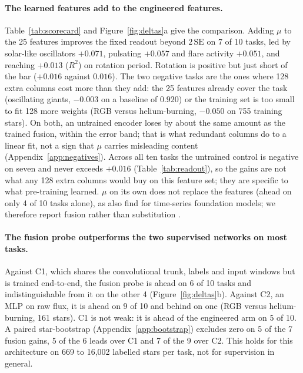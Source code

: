 \documentclass{article}
\begin{document}
\paragraph{The learned features add to the engineered features.} Table~\ref{tab:scorecard} and
Figure~\ref{fig:deltas}a give the comparison. Adding $\mu$ to the 25 features improves the
fixed readout beyond $2\,\mathrm{SE}$ on 7 of 10 tasks, led by solar-like oscillators $+0.071$,
pulsating $+0.057$ and flare activity $+0.051$, and reaching $+0.013$ ($R^{2}$) on rotation period.
Rotation is positive but just short of the
bar ($+0.016$ against $0.016$). The two negative tasks are the ones where 128 extra columns cost more
than they add: the 25 features already cover the task (oscillating giants, $-0.003$ on a baseline
of $0.920$) or the training set is too small to fit 128 more weights (RGB versus helium-burning, $-0.050$ on
755 training stars). On both, an untrained encoder loses by about the same amount as the trained
fusion, within the error band; that is what redundant columns do to a linear fit, not a sign that
$\mu$ carries misleading content (Appendix~\ref{app:negatives}). Across all ten tasks the untrained control is
negative on seven and never exceeds $+0.016$ (Table~\ref{tab:readout}), so the gains are not what any 128 extra columns would
buy on this feature set; they are specific to what pre-training learned. $\mu$ on its own does not
replace the features (ahead on only 4 of 10 tasks alone), as \citet{li2025staremb} also find for
time-series foundation models; we therefore report fusion rather than substitution \citep{makinen2024}.

\paragraph{The fusion probe outperforms the two supervised networks on most tasks.} Against C1, which shares
the convolutional trunk, labels and input windows but is trained end-to-end, the fusion
probe is ahead on 6 of 10 tasks and indistinguishable from it on the other 4
(Figure~\ref{fig:deltas}b). Against
C2, an MLP on raw flux, it is ahead on 9 of 10 and behind on one (RGB versus helium-burning, 161
stars). C1 is not weak: it is ahead of the engineered arm on 5 of 10.
A paired star-bootstrap (Appendix~\ref{app:bootstrap}) excludes zero on 5 of the 7 fusion gains, 5
of the 6 leads over C1 and 7 of the 9 over C2.
This holds for this architecture on 669 to 16{,}002 labelled stars per task, not for
supervision in general.
\end{document}
